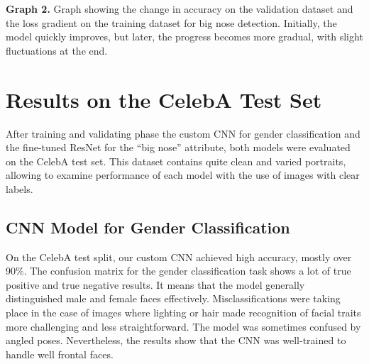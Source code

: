 \documentclass{article}
\begin{document}
\begin{center}
\textbf{Graph 2.} Graph showing the change in accuracy on the validation dataset and the loss gradient on the training dataset for big nose detection. Initially, the model quickly improves, but later, the progress becomes more gradual, with slight fluctuations at the end.
\end{center}
\vspace{0.2cm}
\section{Results on the CelebA Test Set}

After training and validating phase the custom CNN for gender classification and the fine-tuned ResNet for the “big nose” attribute, both models were evaluated on the CelebA test set. This dataset contains quite clean and varied portraits, allowing to examine performance of each model with the use of images with clear labels.

\subsection{CNN Model for Gender Classification}
On the CelebA test split, our custom CNN achieved high accuracy, mostly over 90\%. The confusion matrix for the gender classification task shows a lot of true positive and true negative results. It means that the model generally distinguished male and female faces effectively. Misclassifications were taking place in the case of images where lighting or hair made recognition of facial traits more challenging and less straightforward. The model was sometimes confused by angled poses. Nevertheless, the results show that the CNN was well-trained to handle well frontal faces.
\end{document}
